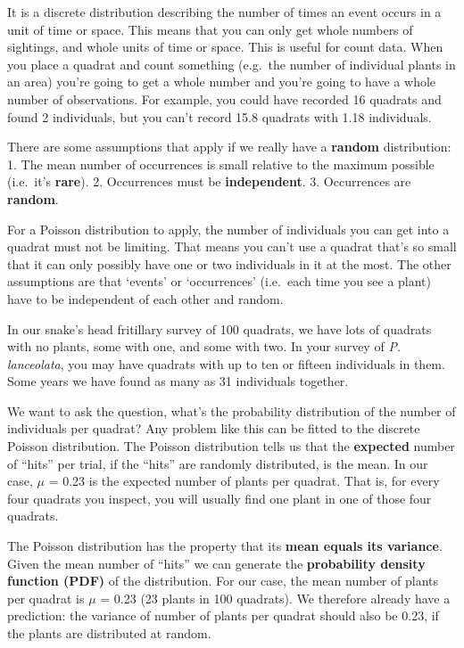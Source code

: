 \documentclass[
  letterpaper,
  DIV=11,
  numbers=noendperiod]{scrreprt}
\begin{document}
It is a discrete distribution describing the number of times an event
occurs in a unit of time or space. This means that you can only get
whole numbers of sightings, and whole units of time or space. This is
useful for count data. When you place a quadrat and count something
(e.g.~the number of individual plants in an area) you're going to get a
whole number and you're going to have a whole number of observations.
For example, you could have recorded 16 quadrats and found 2
individuals, but you can't record 15.8 quadrats with 1.18 individuals.

There are some assumptions that apply if we really have a
\textbf{random} distribution: 1. The mean number of occurrences is small
relative to the maximum possible (i.e.~it's \textbf{rare}). 2.
Occurrences must be \textbf{independent}. 3. Occurrences are
\textbf{random}.

For a Poisson distribution to apply, the number of individuals you can
get into a quadrat must not be limiting. That means you can't use a
quadrat that's so small that it can only possibly have one or two
individuals in it at the most. The other assumptions are that `events'
or `occurrences' (i.e.~each time you see a plant) have to be independent
of each other and random.

In our snake's head fritillary survey of 100 quadrats, we have lots of
quadrats with no plants, some with one, and some with two. In your
survey of \emph{P. lanceolata}, you may have quadrats with up to ten or
fifteen individuals in them. Some years we have found as many as 31
individuals together.

We want to ask the question, what's the probability distribution of the
number of individuals per quadrat? Any problem like this can be fitted
to the discrete Poisson distribution. The Poisson distribution tells us
that the \textbf{expected} number of ``hits'' per trial, if the ``hits''
are randomly distributed, is the mean. In our case, \(\mu\) = 0.23 is
the expected number of plants per quadrat. That is, for every four
quadrats you inspect, you will usually find one plant in one of those
four quadrats.

The Poisson distribution has the property that its \textbf{mean equals
its variance}. Given the mean number of ``hits'' we can generate the
\textbf{probability density function (PDF)} of the distribution. For our
case, the mean number of plants per quadrat is \(\mu\) = 0.23 (23 plants
in 100 quadrats). We therefore already have a prediction: the variance
of number of plants per quadrat should also be 0.23, if the plants are
distributed at random.
\end{document}

